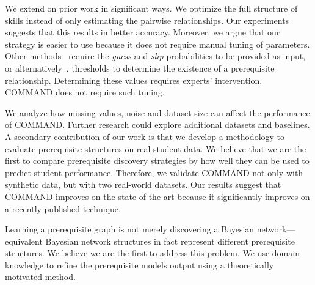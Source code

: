 \documentclass{edm_template}
\begin{document}
        We  extend  on prior work in significant ways.
	We optimize the full structure of skills instead of only estimating the pairwise relationships. 
	Our experiments suggests that this results in better accuracy.
	Moreover, we argue that our strategy is  easier to use %
        because  it does not require  manual tuning of  parameters.
	Other methods~\cite{brunskill2010estimating} require  the  \emph{guess} and \emph{slip} probabilities to be  provided as input,
	or alternatively~\cite{chen2015discovering},  thresholds to determine the existence of a prerequisite relationship.
	Determining these values requires experts' intervention. 
	COMMAND does not require such tuning.
	
	We analyze how missing values, noise and dataset size can affect the performance of COMMAND.
	Further research could explore additional datasets and baselines.
	A secondary contribution of our work is that we develop a methodology to evaluate  prerequisite structures on real student data.
	We believe that we are the first to compare prerequisite discovery strategies by how well they can be used to predict student performance.
	Therefore, we validate COMMAND not only with synthetic data, but with two real-world datasets.
	Our results suggest that COMMAND improves on the state of the art  because it significantly improves on a recently published technique.
	
	
	Learning a prerequisite graph is not merely discovering a Bayesian network--- 
	   equivalent Bayesian network structures  in fact represent different prerequisite structures.
       We believe we are the first to address this problem.
       We use domain knowledge to refine the prerequisite models output using a theoretically motivated method.
	
\end{document}
